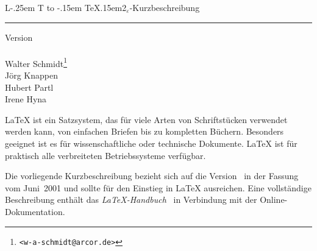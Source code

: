 \documentclass[11pt,a4paper]{article} %
\makeatletter
\DeclareRobustCommand{\sbLaTeXe}{{\fontseries{sbc}\selectfont\boldmath%
        L\kern-.25em%
        {\sbox\z@ T%
         \vbox to\ht\z@{\hbox{\check@mathfonts
                              \fontsize\sf@size\z@
                              \math@fontsfalse\selectfont
                              A}%
                        \vss}%
        }%
        \kern-.15em%
        \TeX\kern.15em2$_{\textstyle\varepsilon}$}}
\newcommand{\manual}{\emph{\LaTeX-Handbuch}~\cite{manual}}
\makeatother
\begin{document}
\nonfrenchspacing      %

\begin{titlepage}
\renewcommand{\thefootnote}{\fnsymbol{footnote}}
{\Huge%
\selectfont
\raggedright
\sbLaTeXe-Kurzbeschreibung
\rule{\textwidth}{0.75pt}
\par
}
\begin{flushleft}
  \normalsize
  \selectfont
  Version \lkver\\
  \lkdate\\[2ex]
  Walter Schmidt\footnote{\texttt{<w-a-schmidt@arcor.de>}}\\
  Jörg Knappen\\
  Hubert Partl%
    \\
  Irene Hyna%
  \\
\end{flushleft}

\vfill

{\parindent=0cm
\LaTeX{} ist ein Satzsystem, das für viele Arten von
Schriftstücken verwendet werden kann, von einfachen Briefen bis zu
kompletten Büchern.  Besonders geeignet ist es für 
wissenschaftliche oder technische Dokumente. \LaTeX{} ist für 
praktisch alle verbreiteten Betriebssysteme verfügbar.
 
Die vorliegende Kurzbeschreibung bezieht sich auf die Version
\LaTeXe\ in der Fassung vom Juni~2001 und sollte für den 
Einstieg in \LaTeX{} ausreichen.  
Eine vollständige Beschreibung enthält das \manual{}
in Verbindung mit der Online-Dokumentation.
}
\setcounter{footnote}{0}
\end{titlepage}
\end{document}
